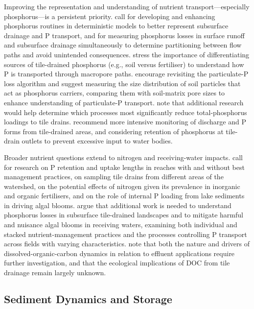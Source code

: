 \documentclass[11pt]{article}
\begin{document}
Improving the representation and understanding of nutrient transport---especially phosphorus---is a persistent priority. \textcite{King2015} call for developing and enhancing phosphorus routines in deterministic models to better represent subsurface drainage and P transport, and for measuring phosphorus losses in surface runoff and subsurface drainage simultaneously to determine partitioning between flow paths and avoid unintended consequences. \textcite{Williams2016} stress the importance of differentiating sources of tile-drained phosphorus (e.g., soil versus fertiliser) to understand how P is transported through macropore paths. \textcite{Qi2018} encourage revisiting the particulate-P loss algorithm and suggest measuring the size distribution of soil particles that act as phosphorus carriers, comparing them with soil-matrix pore sizes to enhance understanding of particulate-P transport. \textcite{Geohring2001} note that additional research would help determine which processes most significantly reduce total-phosphorus loadings to tile drains. \textcite{Zimmer2016} recommend more intensive monitoring of discharge and P forms from tile-drained areas, and considering retention of phosphorus at tile-drain outlets to prevent excessive input to water bodies.

Broader nutrient questions extend to nitrogen and receiving-water impacts. \textcite{Clement2017} call for research on P retention and uptake lengths in reaches with and without best management practices, on sampling tile drains from different areas of the watershed, on the potential effects of nitrogen given its prevalence in inorganic and organic fertilisers, and on the role of internal P loading from lake sediments in driving algal blooms. \textcite{King2018} argue that additional work is needed to understand phosphorus losses in subsurface tile-drained landscapes and to mitigate harmful and nuisance algal blooms in receiving waters, examining both individual and stacked nutrient-management practices and the processes controlling P transport across fields with varying characteristics. \textcite{Ruark2009} note that both the nature and drivers of dissolved-organic-carbon dynamics in relation to effluent applications require further investigation, and that the ecological implications of DOC from tile drainage remain largely unknown.

\subsection{Sediment Dynamics and Storage}
\end{document}
